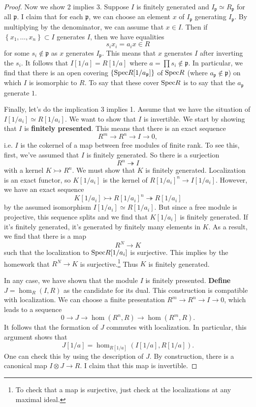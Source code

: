 \begin{proof}
Now we show 2 implies 3. Suppose $I$ is finitely generated and $I_{\mathfrak{p}} \simeq
R_{\mathfrak{p}}$ for all $\mathfrak{p}$. I claim that for each $\mathfrak{p}
$, we can choose an element $x$ of $I_{\mathfrak{p}}$ generating $I_{\mathfrak{p}}$. 
By multiplying by the denominator, we can assume that $x \in I$. 
Then if $\left\{x_1, \dots, x_n\right\} \subset I$ generates $I$, then we have
equalities
\[ s_i x_i = a_i x \in R  \]
for some $s_i \notin \mathfrak{p}$ as $x$ generates $I_{\mathfrak{p}}$. This means that $x$ generates $I$ after inverting the $s_i$. It
follows that $I[1/a] = R[1/a]$ where $a = \prod s_i \notin \mathfrak{p}$.
In particular, we find that there is an open covering $\{\mathrm{Spec}
R[1/a_{\mathfrak{p}}] \}$ of $\mathrm{Spec} R$ (where $a_{\mathfrak{p}} \notin
\mathfrak{p}$) on which $I$ is isomorphic to $R$. 
To say that these cover $\mathrm{Spec} R$ is to say that the $a_{\mathfrak{p}}$
generate $1$. 

Finally, let's do the implication 3 implies 1.  Assume that we have the
situation of $I[1/a_i] \simeq R[1/a_i]$. We want to show that $I$ is invertible. 
We start by showing that $I$ is \textbf{finitely presented}. This means that
there is an exact sequence
\[ R^m \to R^n \to I \to 0,  \]
i.e. $I$ is the cokernel of a map between free modules of finite rank.
To see this, first, we've assumed that $I$ is finitely generated. So there is a
surjection
\[ R^n \twoheadrightarrow I  \]
with a kernel $K \rightarrowtail  R^n$. We must show that $K$ is finitely
generated. Localization is an exact functor, so $K[1/a_i]$ is the kernel of
$R[1/a_i]^n \to I[1/a_i]$. However, we have an exact sequence
\[ K[1/a_i] \rightarrowtail  R[1/a_i]^n \twoheadrightarrow R[1/a_i]  \]
by the assumed isomorphism $I[1/a_i] \simeq R[1/a_i]$. But since a free module
is projective, this sequence splits and we find that $K[1/a_i]$ is finitely
generated. If it's finitely generated, it's generated by finitely many elements
in $K$. 
As a result, we find that there is a map
\[ R^N \to K  \]
such that the localization to $\mathrm{Spec} R[1/a_i]$ is surjective. This implies by
the homework that $R^N \to K$ is surjective.\footnote{To check that a map is
surjective, just check at the localizations at any maximal ideal.} Thus $K$ is finitely generated. 

In any case, we have shown that the module $I$ is finitely presented.
\textbf{Define} $J = \hom_R(I, R)$ as the candidate for its dual. This
construction is compatible with localization.
We can choose a finite presentation $R^m \to R^n \to I \to 0$, which leads to a
sequence
\[ 0 \to J \to \hom(R^n, R) \to \hom(R^m, R).  \]
It follows that the formation of $J$ commutes with localization. 
In particular, this argument shows that
\[ J[1/a] = \hom_{R[1/a]}(I[1/a], R[1/a]).  \]
One can check this by using the description of $J$. By construction, there is a
canonical map $I \otimes J \to R$. 
I claim that this map is invertible.


\end{proof}
